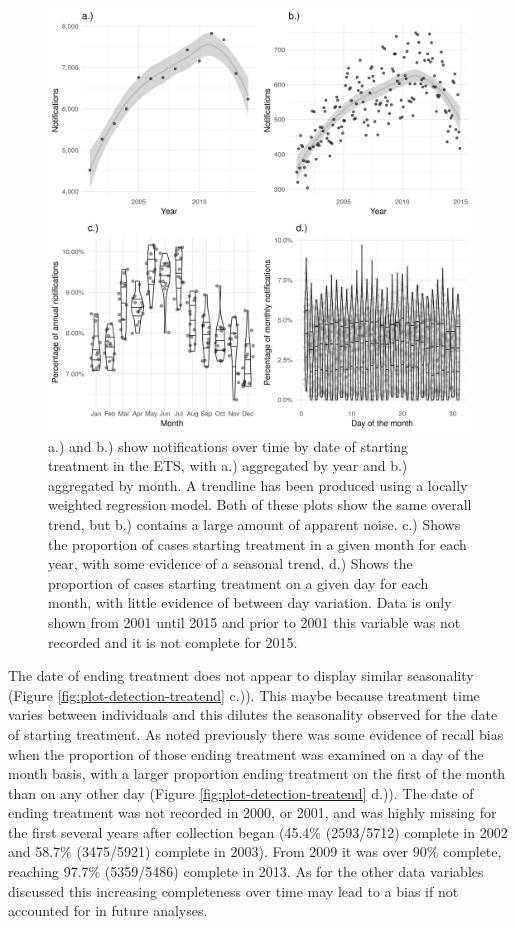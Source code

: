 \documentclass[11pt,twoside]{bristolthesis}
\begin{document}
  \begin{figure}
  
  {\centering \includegraphics[width=0.8\linewidth,]{chapters/tb-epi-england/figures/plot-detection-starttreatdate} 
  
  }
  
  \caption[a.) and b.) show notifications over time by date of starting treatment in the ETS, with a.) aggregated by year and  b.) aggregated by month.]{a.) and b.) show notifications over time by date of starting treatment in the ETS, with a.) aggregated by year and  b.) aggregated by month. A trendline has been produced using a locally weighted regression model. Both of these plots show the same overall trend, but b.) contains a large amount of apparent noise. c.) Shows the proportion of cases starting treatment in a given month for each year, with some evidence of a seasonal trend. d.) Shows the proportion of cases starting treatment on a given day for each month, with little evidence of between day variation. Data is only shown from 2001 until 2015 and prior to 2001 this variable was not recorded and it is not complete for 2015.}\label{fig:plot-detection-starttreatdate}
  \end{figure}
  The date of ending treatment does not appear to display similar seasonality (Figure \ref{fig:plot-detection-treatend} c.)). This maybe because treatment time varies between individuals and this dilutes the seasonality observed for the date of starting treatment. As noted previously there was some evidence of recall bias when the proportion of those ending treatment was examined on a day of the month basis, with a larger proportion ending treatment on the first of the month than on any other day (Figure \ref{fig:plot-detection-treatend} d.)). The date of ending treatment was not recorded in 2000, or 2001, and was highly missing for the first several years after collection began (45.4\% (2593/5712) complete in 2002 and 58.7\% (3475/5921) complete in 2003). From 2009 it was over 90\% complete, reaching 97.7\% (5359/5486) complete in 2013. As for the other data variables discussed this increasing completeness over time may lead to a bias if not accounted for in future analyses.
\end{document}
